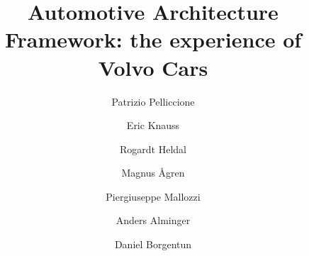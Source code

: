 \documentclass[preprint,12pt,3p]{elsarticle}
\begin{document}
\begin{frontmatter}

\title{Automotive Architecture Framework: the experience of Volvo Cars}




\author[label1]{Patrizio Pelliccione}
\author[label1]{Eric Knauss}
\author[label1,label3]{Rogardt Heldal}
\author[label1]{Magnus \AA gren}
\author[label1]{Piergiuseppe Mallozzi}
\author[label2]{Anders Alminger}
\author[label2]{Daniel Borgentun}

\address[label1]{Chalmers University of Technology $|$ University of Gothenburg, Department of Computer Science and Engineering, Sweden}
\address[label2]{Volvo Cars, Sweden}
\address[label3]{Bergen University College, Norway}





\end{frontmatter}
\end{document}
